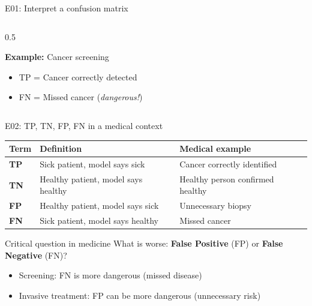 \documentclass[aspectratio=169, 10pt]{beamer}
\begin{document}
\begin{frame}{E01: Interpret a confusion matrix}
\begin{columns}
\begin{column}{0.5\textwidth}
            \vspace{3mm}
            
            \textbf{Example:} Cancer screening
            \begin{itemize}
                \item TP = Cancer correctly detected
                \item FN = Missed cancer (\textit{dangerous!})
            \end{itemize}
        \end{column}
    \end{columns}
    
\end{frame}

\begin{frame}{E02: TP, TN, FP, FN in a medical context}
    
    \begin{table}
        \centering
        \begin{tabular}{@{}lp{5cm}p{5cm}@{}}
            \toprule
            \textbf{Term} & \textbf{Definition} & \textbf{Medical example} \\
            \midrule
            \textbf{TP} & Sick patient, model says sick & Cancer correctly identified \\
            \textbf{TN} & Healthy patient, model says healthy & Healthy person confirmed healthy \\
            \textbf{FP} & Healthy patient, model says sick & Unnecessary biopsy \\
            \textbf{FN} & Sick patient, model says healthy & \textcolor{uibred}{Missed cancer} \\
            \bottomrule
        \end{tabular}
    \end{table}
    
    \vspace{5mm}
    
    \begin{alertblock}{Critical question in medicine}
        What is worse: \textbf{False Positive} (FP) or \textbf{False Negative} (FN)?
        \begin{itemize}
            \item Screening: FN is more dangerous (missed disease)
            \item Invasive treatment: FP can be more dangerous (unnecessary risk)
        \end{itemize}
    \end{alertblock}
    
\end{frame}
\end{document}
